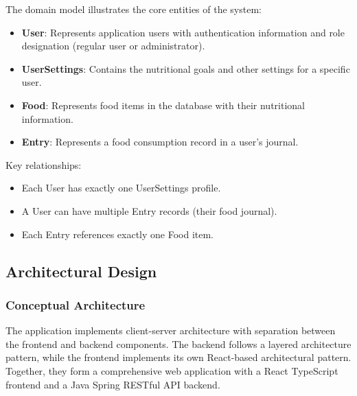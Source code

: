 \documentclass[a4paper,10pt]{article}
\begin{document}
        The domain model illustrates the core entities of the system:

        \begin{itemize}
            \item \textbf{User}: Represents application users with authentication information and role designation (regular user or administrator).
            \item \textbf{UserSettings}: Contains the nutritional goals and other settings for a specific user.
            \item \textbf{Food}: Represents food items in the database with their nutritional information.
            \item \textbf{Entry}: Represents a food consumption record in a user's journal.
        \end{itemize}

        Key relationships:
        \begin{itemize}
            \item Each User has exactly one UserSettings profile.
            \item A User can have multiple Entry records (their food journal).
            \item Each Entry references exactly one Food item.
        \end{itemize}


    \subsection{Architectural Design}
        \subsubsection{Conceptual Architecture}
            The application implements client-server architecture with separation between the frontend and backend components. The backend follows a layered architecture pattern, while the frontend implements its own React-based architectural pattern. Together, they form a comprehensive web application with a React TypeScript frontend and a Java Spring RESTful API backend.
\end{document}
